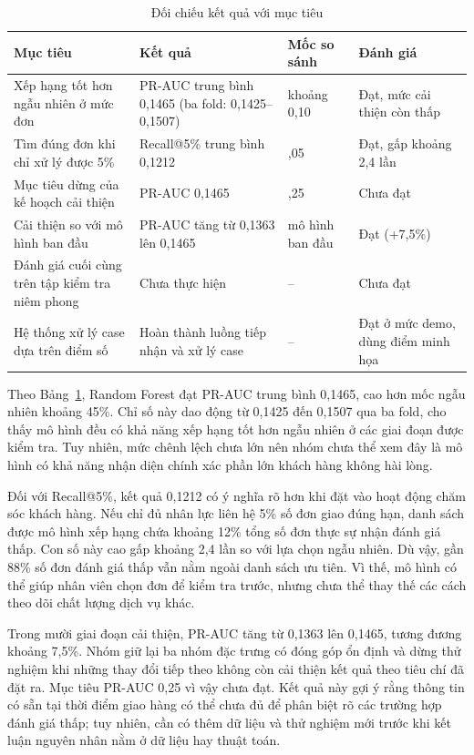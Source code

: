 \documentclass[12pt,a4paper]{report}
\begin{document}
\begin{table}[htbp]\centering\small
\caption{Đối chiếu kết quả với mục tiêu}\label{tab:disc-goals}
\begin{tabular}{>{\raggedright\arraybackslash}p{4.1cm}>{\raggedright\arraybackslash}p{4.6cm}>{\raggedright\arraybackslash}p{2.3cm}>{\raggedright\arraybackslash}p{2.6cm}}
\toprule
Mục tiêu & Kết quả & Mốc so sánh & Đánh giá \\
\midrule
Xếp hạng tốt hơn ngẫu nhiên ở mức đơn & PR-AUC trung bình 0,1465 (ba fold: 0,1425--0,1507) & khoảng 0,10 & Đạt, mức cải thiện còn thấp \\
Tìm đúng đơn khi chỉ xử lý được 5\% & Recall@5\% trung bình 0,1212 & 0,05 & Đạt, gấp khoảng 2,4 lần \\
Mục tiêu dừng của kế hoạch cải thiện & PR-AUC 0,1465 & 0,25 & Chưa đạt \\
Cải thiện so với mô hình ban đầu & PR-AUC tăng từ 0,1363 lên 0,1465 & mô hình ban đầu & Đạt (+7,5\%) \\
Đánh giá cuối cùng trên tập kiểm tra niêm phong & Chưa thực hiện & -- & Chưa đạt \\
Hệ thống xử lý case dựa trên điểm số & Hoàn thành luồng tiếp nhận và xử lý case & -- & Đạt ở mức demo, dùng điểm minh họa \\
\bottomrule
\end{tabular}
\end{table}

Theo Bảng~\ref{tab:disc-goals}, Random Forest đạt PR-AUC trung bình 0,1465, cao hơn mốc ngẫu nhiên khoảng 45\%. Chỉ số này dao động từ 0,1425 đến 0,1507 qua ba fold, cho thấy mô hình đều có khả năng xếp hạng tốt hơn ngẫu nhiên ở các giai đoạn được kiểm tra. Tuy nhiên, mức chênh lệch chưa lớn nên nhóm chưa thể xem đây là mô hình có khả năng nhận diện chính xác phần lớn khách hàng không hài lòng.

Đối với Recall@5\%, kết quả 0,1212 có ý nghĩa rõ hơn khi đặt vào hoạt động chăm sóc khách hàng. Nếu chỉ đủ nhân lực liên hệ 5\% số đơn giao đúng hạn, danh sách được mô hình xếp hạng chứa khoảng 12\% tổng số đơn thực sự nhận đánh giá thấp. Con số này cao gấp khoảng 2,4 lần so với lựa chọn ngẫu nhiên. Dù vậy, gần 88\% số đơn đánh giá thấp vẫn nằm ngoài danh sách ưu tiên. Vì thế, mô hình có thể giúp nhân viên chọn đơn để kiểm tra trước, nhưng chưa thể thay thế các cách theo dõi chất lượng dịch vụ khác.

Trong mười giai đoạn cải thiện, PR-AUC tăng từ 0,1363 lên 0,1465, tương đương khoảng 7,5\%. Nhóm giữ lại ba nhóm đặc trưng có đóng góp ổn định và dừng thử nghiệm khi những thay đổi tiếp theo không còn cải thiện kết quả theo tiêu chí đã đặt ra. Mục tiêu PR-AUC 0,25 vì vậy chưa đạt. Kết quả này gợi ý rằng thông tin có sẵn tại thời điểm giao hàng có thể chưa đủ để phân biệt rõ các trường hợp đánh giá thấp; tuy nhiên, cần có thêm dữ liệu và thử nghiệm mới trước khi kết luận nguyên nhân nằm ở dữ liệu hay thuật toán.
\end{document}
